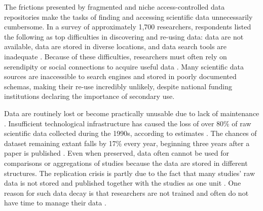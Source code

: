 \documentclass[conference]{IEEEtran}
\begin{document}
The frictions presented by fragmented and niche access-controlled data repositories make the tasks of finding and accessing scientific data unnecessarily cumbersome. In a survey of approximately 1,700 researchers, respondents listed the following as top difficulties in discovering and re-using data: data are not available, data are stored in diverse locations, and data search tools are inadequate \cite{Gregory2020Lost}.
Because of these difficulties, researchers must often rely on serendipity or social connections to acquire useful data \cite{Gregory2020Lost}. Many scientific data sources are inaccessible to search engines and stored in poorly documented schemas, making their re-use incredibly unlikely, despite national funding institutions declaring the importance of secondary use. 

Data are routinely lost or become practically unusable due to lack of maintenance \cite{JahnkeAsher}. 
Insufficient technological infrastructure has caused the loss of over 80\% of raw scientific data collected during the 1990s, according to estimates \cite{WienerBronner}. 
The chances of dataset remaining extant falls by 17\% every year, beginning three years after a paper is published \cite{Vines2014}. 
Even when preserved, data often cannot be used for comparisons or aggregations of studies because the data are stored in different structures.
The replication crisis is partly due to the fact that many studies’ raw data is not stored and published together with the studies as one unit \cite{Miyakawa2020}. One reason for such data decay is that researchers are not trained and often do not have time to manage their data \cite{TeperekDunning}. 
\end{document}
